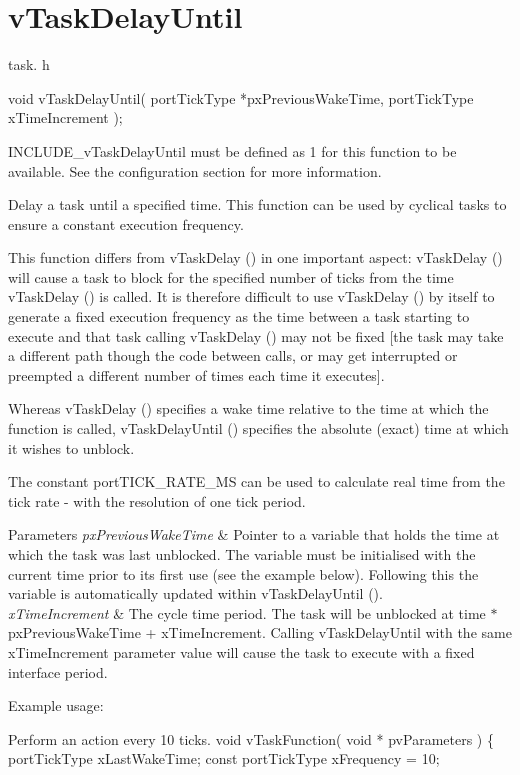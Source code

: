 \hypertarget{group__v_task_delay_until}{\section{v\-Task\-Delay\-Until}
\label{group__v_task_delay_until}
}
task. h 
\begin{DoxyPre}void vTaskDelayUntil( portTickType *pxPreviousWakeTime, portTickType xTimeIncrement );\end{DoxyPre}


I\-N\-C\-L\-U\-D\-E\-\_\-v\-Task\-Delay\-Until must be defined as 1 for this function to be available. See the configuration section for more information.

Delay a task until a specified time. This function can be used by cyclical tasks to ensure a constant execution frequency.

This function differs from v\-Task\-Delay () in one important aspect\-: v\-Task\-Delay () will cause a task to block for the specified number of ticks from the time v\-Task\-Delay () is called. It is therefore difficult to use v\-Task\-Delay () by itself to generate a fixed execution frequency as the time between a task starting to execute and that task calling v\-Task\-Delay () may not be fixed \mbox{[}the task may take a different path though the code between calls, or may get interrupted or preempted a different number of times each time it executes\mbox{]}.

Whereas v\-Task\-Delay () specifies a wake time relative to the time at which the function is called, v\-Task\-Delay\-Until () specifies the absolute (exact) time at which it wishes to unblock.

The constant port\-T\-I\-C\-K\-\_\-\-R\-A\-T\-E\-\_\-\-M\-S can be used to calculate real time from the tick rate -\/ with the resolution of one tick period.


\begin{DoxyParams}{Parameters}
{\em px\-Previous\-Wake\-Time} & Pointer to a variable that holds the time at which the task was last unblocked. The variable must be initialised with the current time prior to its first use (see the example below). Following this the variable is automatically updated within v\-Task\-Delay\-Until ().\\
\hline
{\em x\-Time\-Increment} & The cycle time period. The task will be unblocked at time $\ast$px\-Previous\-Wake\-Time + x\-Time\-Increment. Calling v\-Task\-Delay\-Until with the same x\-Time\-Increment parameter value will cause the task to execute with a fixed interface period.\\
\hline
\end{DoxyParams}
Example usage\-: 
\begin{DoxyPre}
Perform an action every 10 ticks.
 void vTaskFunction( void * pvParameters )
 \{
 portTickType xLastWakeTime;
 const portTickType xFrequency = 10;\end{DoxyPre}



